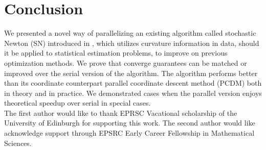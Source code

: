 \documentclass[11pt]{article}
\newtheorem{lemma}{Lemma}
\begin{document}
	
%	
%		
	
	
	
	\section{Conclusion}
	We presented a novel way of parallelizing an existing algorithm called stochastic Newton (SN) introduced in \cite{SDNA}, which utilizes curvature information in data, should it be applied to statistical estimation problems, to improve on previous optimization methods. We prove that converge guarantees can be matched or improved over the serial version of the algorithm. The algorithm performs better than its coordinate counterpart parallel coordinate descent method (PCDM) both in theory and in practice. We demonstrated cases when the parallel version enjoys theoretical speedup over serial in special cases.
	\hfil \\ 
 The first author would like to thank EPRSC Vacational scholarship of the University of Edinburgh for supporting this work. The second author would like acknowledge support through EPSRC Early Career Fellowship in Mathematical Sciences.
\end{document}
